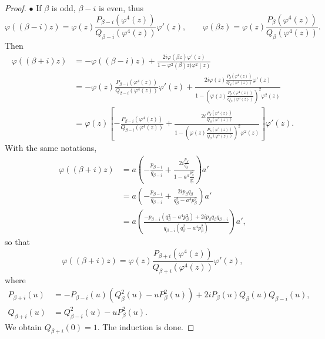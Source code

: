 \documentclass[11pt,a4paper]{article}
\begin{document}
\begin{proof}
$\bullet$ If $\beta$ is odd, $\beta - i$ is even, thus
$$
\varphi((\beta - i)z) = \varphi(z) \frac{P_{\beta - i}\left(\varphi^4(z)\right)}{Q_{\beta -i}\left(\varphi^4(z)\right)}\varphi'(z),\qquad
 \varphi(\beta z) = \varphi(z) \frac{P_{\beta}\left(\varphi^4(z)\right)}{Q_{\beta}\left(\varphi^4(z)\right)}.
$$
Then
\begin{align*}
\varphi((\beta + i)z) &= -\varphi((\beta - i)z) + \frac{2i \varphi(\beta z) \varphi'(z)}{1 - \varphi^2(\beta )z) \varphi^2(z)}\\
&=- \varphi(z) \frac{P_{\beta - i}\left(\varphi^4(z)\right)}{Q_{\beta - i}\left(\varphi^4(z)\right)}\varphi'(z) + \frac{2i \varphi(z) \frac{P_{\beta}\left(\varphi^4(z)\right)}{Q_{\beta}\left(\varphi^4(z)\right)} \varphi'(z)}{1 - \left(\varphi(z) \frac{P_{\beta}\left(\varphi^4(z)\right)}{Q_{\beta}\left(\varphi^4(z)\right)}\right)^2\varphi^2(z)}\\
&= \varphi(z) \left[ -\frac{P_{\beta - i}\left(\varphi^4(z)\right)}{Q_{\beta - i}\left(\varphi^4(z)\right)} + \frac{2i  \frac{P_{\beta}\left(\varphi^4(z)\right)}{Q_{\beta}\left(\varphi^4(z)\right)}}{1 - \left(\varphi(z) \frac{P_{\beta}\left(\varphi^4(z)\right)}{Q_{\beta}\left(\varphi^4(z)\right)}\right)^2\varphi^2(z)}\right] \varphi'(z).
\end{align*}
With the same notations,
\begin{align*}
\varphi((\beta + i)z) &= a \left( - \frac{p_{\beta-i}}{q_{\beta-i}} + \frac{2i \frac{p_\beta}{q_\beta}}{1 - a^4 \frac{p_\beta^2}{q_\beta^2}}\right)a'\\
&= a \left( - \frac{p_{\beta-i}}{q_{\beta-i}} + \frac{2ip_\beta q_\beta }{q_\beta ^2 - a^4 p_\beta^2}\right) a'\\
&= a \left(\frac{ -p_{\beta-i}(q_\beta^2 - a^4 p_\beta^2) + 2ip_\beta q_\beta q_{\beta-i}}{q_{\beta - i}(q_\beta^2 - a^4 p_\beta^2)}\right) a',
\end{align*}
so that
$$\varphi((\beta + i)z)  = \varphi(z) \frac{P_{\beta + i}(\varphi^4(z))}{Q_{\beta + i}(\varphi^4(z))} \varphi'(z),$$
where
\begin{align*}
P_{\beta + i}(u) &= -P_{\beta - i}(u)(Q_{\beta}^2(u) - u P_{\beta}^2(u)) + 2i P_{\beta}(u) Q_{\beta}(u) Q_{\beta -i}(u),\\
Q_{\beta + i}(u) &= Q_{\beta - i}^2(u) - u P_{\beta}^2(u).
\end{align*}
We obtain $Q_{\beta + i}(0) = 1$. The induction is done.
\end{proof}

\bigskip
\end{document}
